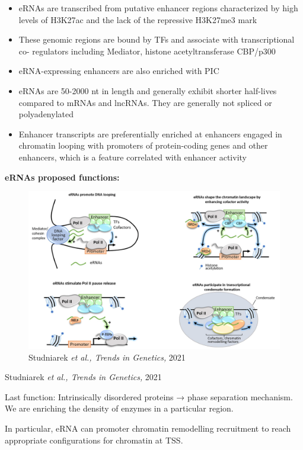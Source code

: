 \begin{itemize}
\tightlist
\item
  eRNAs are transcribed from putative enhancer regions characterized by high levels of H3K27ac and the lack of the repressive H3K27me3 mark
\item
  These genomic regions are bound by TFs and associate with transcriptional co- regulators including Mediator, histone acetyltransferase CBP/p300
\item
  eRNA-expressing enhancers are also enriched with PIC
\item
  eRNAs are 50-2000 nt in length and generally exhibit shorter half-lives compared to
  mRNAs and lncRNAs. They are generally not spliced or polyadenylated
\item
  Enhancer transcripts are preferentially enriched at enhancers engaged in chromatin looping with promoters of protein-coding genes and other enhancers, which is a feature correlated with enhancer activity
\end{itemize}

\textbf{eRNAs proposed functions:}

\begin{figure}
\centering
\includegraphics[width=\textwidth]{../_resources/Screenshot_2022-10-12_at_10-00-02.png}
\caption{Studniarek \emph{et al., Trends in Genetics,} 2021}
\end{figure}

Studniarek \emph{et al., Trends in Genetics,} 2021

Last function: Intrinsically disordered proteins → phase separation mechanism. We are enriching the density of enzymes in a particular region.

In particular, eRNA can promoter chromatin remodelling recruitment to reach appropriate configurations for chromatin at TSS.

